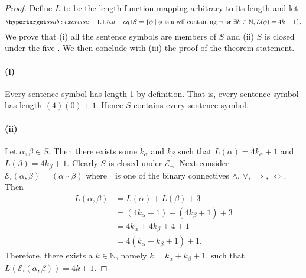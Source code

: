\documentclass{report}
\begin{document}
  \begin{proof}

    Define $L$ to be the length function mapping arbitrary
       to its length and let
      \begin{equation}
        \hyperlabel{ssub:exercise-1.1.5.a-eq1}
        S = \{\phi \mid
          \phi \text{ is a wff containing } \neg \text{ or }
          \exists k \in \mathbb{N}, L(\phi) = 4k + 1\}.
      \end{equation}
    We prove that (i) all the sentence symbols are members of $S$ and (ii)
      $S$ is closed under the five .
    We then conclude with (iii) the proof of the theorem statement.

    \paragraph{(i)}%

      Every sentence symbol has length 1 by definition.
      That is, every sentence symbol has length $(4)(0) + 1$.
      Hence $S$ contains every sentence symbol.

    \paragraph{(ii)}%

      Let $\alpha, \beta \in S$.
      Then there exists some $k_\alpha$ and $k_\beta$ such that
        $L(\alpha) = 4k_\alpha + 1$ and $L(\beta) = 4k_\beta + 1$.
      Clearly $S$ is closed under $\mathcal{E}_{\neg}$.
      Next consider
        $\mathcal{E}_{\square}(\alpha, \beta) = (\alpha \mathop{\square} \beta)$
        where $\square$ is one of the binary connectives $\land$, $\lor$,
          $\Rightarrow$, $\Leftrightarrow$.
      Then
        \begin{align*}
          L(\alpha, \beta)
            & = L(\alpha) + L(\beta) + 3 \\
            & = (4k_\alpha + 1) + (4k_\beta + 1) + 3 \\
            & = 4k_\alpha + 4k_\beta + 4 + 1 \\
            & = 4(k_\alpha + k_\beta + 1) + 1.
        \end{align*}
      Therefore, there exists a $k \in \mathbb{N}$, namely
        $k = k_\alpha + k_\beta + 1$, such that
        $L(\mathcal{E}_{\square}(\alpha, \beta)) = 4k + 1$.


\end{proof}
\end{document}
